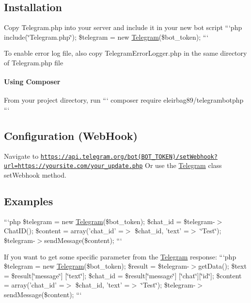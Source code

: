 \subsection*{Installation }


\begin{DoxyItemize}
\item Copy Telegram.\-php into your server and include it in your new bot script ```php include(\char`\"{}\-Telegram.\-php\char`\"{}); \$telegram = new \hyperlink{class_telegram}{Telegram}(\$bot\-\_\-token); ```
\item To enable error log file, also copy Telegram\-Error\-Logger.\-php in the same directory of Telegram.\-php file
\end{DoxyItemize}

\paragraph*{Using Composer}

From your project directory, run ``` composer require eleirbag89/telegrambotphp ```

\subsection*{Configuration (Web\-Hook) }

Navigate to \href{https://api.telegram.org/bot(BOT_TOKEN)/setWebhook?url=https://yoursite.com/your_update.php}{\tt https\-://api.\-telegram.\-org/bot(\-B\-O\-T\-\_\-\-T\-O\-K\-E\-N)/set\-Webhook?url=https\-://yoursite.\-com/your\-\_\-update.\-php} Or use the \hyperlink{class_telegram}{Telegram} class set\-Webhook method.

\subsection*{Examples }

```php \$telegram = new \hyperlink{class_telegram}{Telegram}(\$bot\-\_\-token); \$chat\-\_\-id = \$telegram-\/$>$Chat\-I\-D(); \$content = array('chat\-\_\-id' =$>$ \$chat\-\_\-id, 'text' =$>$ \char`\"{}\-Test\char`\"{}); \$telegram-\/$>$send\-Message(\$content); ```

If you want to get some specific parameter from the \hyperlink{class_telegram}{Telegram} response\-: ```php \$telegram = new \hyperlink{class_telegram}{Telegram}(\$bot\-\_\-token); \$result = \$telegram-\/$>$get\-Data(); \$text = \$result\mbox{[}\char`\"{}message\char`\"{}\mbox{]} \mbox{[}\char`\"{}text\char`\"{}\mbox{]}; \$chat\-\_\-id = \$result\mbox{[}\char`\"{}message\char`\"{}\mbox{]} \mbox{[}\char`\"{}chat\char`\"{}\mbox{]}\mbox{[}\char`\"{}id\char`\"{}\mbox{]}; \$content = array('chat\-\_\-id' =$>$ \$chat\-\_\-id, 'text' =$>$ \char`\"{}\-Test\char`\"{}); \$telegram-\/$>$send\-Message(\$content); ```

